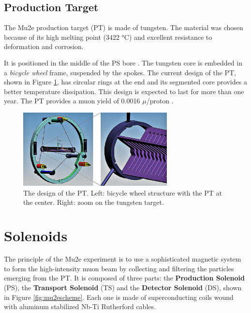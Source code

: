 \subsection{Production Target}
The Mu2e production target (PT) is made of tungsten. 
The material was chosen because of its high 
melting point (3422 °C) and excellent resistance to deformation and corrosion.

It is positioned in the middle of the PS bore \cite{bartoszek2015mu2e}.
The tungsten core is embedded in a \textit{bicycle wheel} frame, 
suspended by the spokes.
The current design of the PT, shown in Figure \ref{fig:PT}, 
has circular rings at the end and its segmented core provides a better temperature 
dissipation. This design is expected to last for more than one year. The PT provides a muon yield of 0.0016 $\mu$/proton \cite{PT}.
\begin{figure}[!h]
    \centering
    \includegraphics[width =0.7\textwidth]{figures/png/Screenshot_20240706_114229.png}
    \caption[The Production Target design.]{The design of the PT. Left: bicycle wheel 
      structure with the PT at the
    center. Right: zoom on the tungsten target.}
    \label{fig:PT}
\end{figure}

\section{Solenoids}
The principle of the Mu2e experiment is to use a sophisticated magnetic system
to form the high-intensity muon beam by collecting and filtering the particles emerging from the PT. 
It is composed of three parts: the \textbf{Production Solenoid} (PS), the \textbf{Transport Solenoid} (TS) 
and the \textbf{Detector Solenoid} (DS), shown in Figure \ref{fig:mu2escheme}. 
Each one is made of superconducting 
coils wound with aluminum stabilized Nb-Ti Rutherford cables.

